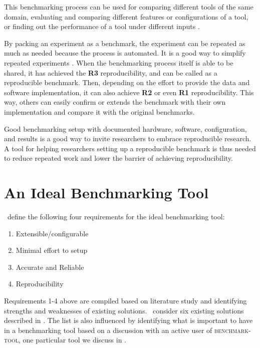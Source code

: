 {	This benchmarking process can be used for comparing different tools of the same domain, evaluating and comparing different features or configurations of a tool, or finding out the performance of a tool under different inputs \citep{beyerReliableBenchmarkingRequirements2019}.
}

By packing an experiment as a benchmark, the experiment can be repeated as much as needed because the process is automated.
It is a good way to simplify repeated experiments \citep{tichyShouldComputerScientists1998}.
When the benchmarking process itself is able to be shared, it has achieved the \textbf{R3} reproducibility, and can be called as a reproducible benchmark.
Then, depending on the effort to provide the data and software implementation, it can also achieve \textbf{R2} or even \textbf{R1} reproducibility.
This way, others can easily confirm or extends the benchmark with their own implementation and compare it with the original benchmarks.

Good benchmarking setup with documented hardware, software, configuration, and results is a good way to invite researchers to embrace reproducible research.
A tool for helping researchers setting up a reproducible benchmark is thus needed to reduce repeated work and lower the barrier of achieving reproducibility.


\section{An Ideal Benchmarking Tool}
\label{sec:idealBenchmarkingTool}

\First~define the following four requirements for the ideal benchmarking tool:
\begin{enumerate}[noitemsep]
	\item Extensible/configurable
	\item Minimal effort to setup
	\item Accurate and Reliable
	\item Reproducibility
\end{enumerate}

Requirements 1-4 above are compiled based on literature study and identifying strengths and weaknesses of existing solutions.
\First~consider six existing solutions described in .
The list is also influenced by identifying what is important to have in a benchmarking tool based on a discussion with an active user of \textsc{benchmark-tool}, one particular tool we discuss in .


